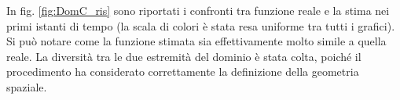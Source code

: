 \documentclass[a4paper,11pt,twoside,openright]{book}							%
\begin{document}
In fig. \ref{fig:DomC_ris} sono riportati i confronti tra funzione reale e la stima nei primi istanti di tempo (la scala di colori è stata resa uniforme tra tutti i grafici). Si può notare come la funzione stimata sia effettivamente molto simile a quella reale. La diversità tra le due estremità del dominio è stata colta, poiché il procedimento ha considerato correttamente la definizione della geometria spaziale.
\newpage
\begin{figure}[H]
\centering
\end{figure}
\end{document}
